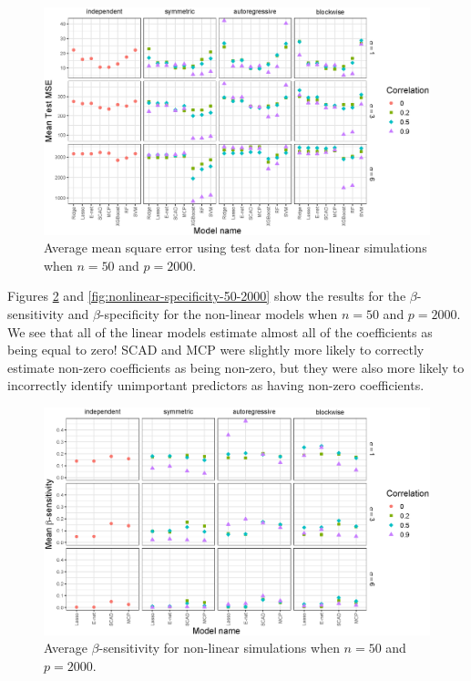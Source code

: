 \documentclass{article}
\begin{document}
	\begin{figure}[h!]
		\centering
		\includegraphics[width = \textwidth]{images/nonlinear-facet/test-mse/facet_test_mse_2_50_2000.eps}
		\captionsetup{width = 0.8\textwidth}
		\caption{Average mean square error using test data for non-linear simulations when $n = 50$ and $p = 2000$.}
		\label{fig:nonlinear-test-mse-50-2000}
	\end{figure}
	
	Figures \ref{fig:nonlinear-sensitivity-50-2000} and \ref{fig:nonlinear-specificity-50-2000} show the results for the $\beta$-sensitivity and $\beta$-specificity for the non-linear models when $n = 50$ and $p = 2000$. We see that all of the linear models estimate almost all of the coefficients as being equal to zero! SCAD and MCP were slightly more likely to correctly estimate non-zero coefficients as being non-zero, but they were also more likely to incorrectly identify unimportant predictors as having non-zero coefficients.
	\begin{figure}[h!]
		\centering
		\includegraphics[width = \textwidth]{images/nonlinear-facet/sensitivity/facet_sensitivity_2_50_2000.eps}
		\captionsetup{width = 0.8\textwidth}
		\caption{Average $\beta$-sensitivity for non-linear simulations when $n = 50$ and $p = 2000$.}
		\label{fig:nonlinear-sensitivity-50-2000}
	\end{figure}
	
\end{document}
